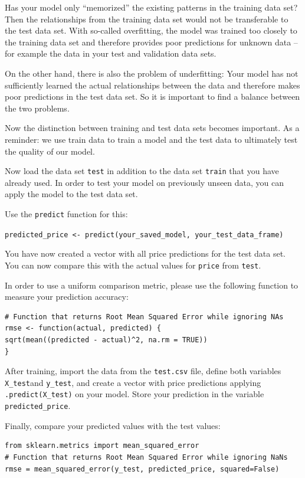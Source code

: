 \documentclass[
  11pt,
]{book}
\newenvironment{tips}[1]
  {
  \begin{itemize}
  \footnotesize
  \renewcommand{\labelitemi}{
    \raisebox{-.7\height}[0pt][0pt]{
      {\setkeys{Gin}{width=3em,keepaspectratio}
        \texttt{[image: images/\#1.png]}}
    }
  }
  \setlength{\fboxsep}{1em}
  \begin{rbox}
  \item
  }
  {
  \end{rbox}
  \end{itemize}
  }
\newenvironment{tipsp}[1]
  {
  \begin{itemize}
  \footnotesize
  \renewcommand{\labelitemi}{
    \raisebox{-.7\height}[0pt][0pt]{
      {\setkeys{Gin}{width=3em,keepaspectratio}
        \texttt{[image: images/\#1.png]}}
    }
  }
  \setlength{\fboxsep}{1em}
  \begin{pbox}
  \item
  }
  {
  \end{pbox}
  \end{itemize}
  }
\begin{document}
Has your model only ``memorized'' the existing patterns in the training data set?
Then the relationships from the training data set would not be transferable to the test data set. With so-called overfitting, the model was trained too closely to the training data set and therefore provides poor predictions for unknown data -- for example the data in your test and validation data sets.

On the other hand, there is also the problem of underfitting: Your model has not sufficiently learned the actual relationships between the data and therefore makes poor predictions in the test data set. So it is important to find a balance between the two problems.

Now the distinction between training and test data sets becomes important. As a reminder: we use train data to train a model and the test data to ultimately test the quality of our model.

Now load the data set \texttt{test} in addition to the data set \texttt{train} that you have already used. In order to test your model on previously unseen data, you can apply the model to the test data set.

\begin{tips}r

Use the \texttt{predict} function for this:

\texttt{predicted\_price\ \textless{}-\ predict(your\_saved\_model,\ your\_test\_data\_frame)}

You have now created a vector with all price predictions for the test data set. You can now compare this with the actual values for \texttt{price} from \texttt{test}.

In order to use a uniform comparison metric, please use the following function to measure your prediction accuracy:

\begin{verbatim}
# Function that returns Root Mean Squared Error while ignoring NAs
rmse <- function(actual, predicted) {
sqrt(mean((predicted - actual)^2, na.rm = TRUE))
}
\end{verbatim}

\end{tips}

\begin{tipsp}p

After training, import the data from the \texttt{test.csv} file, define both variables \texttt{X\_test}and \texttt{y\_test}, and create a vector with price predictions applying \texttt{.predict(X\_test)} on your model. Store your prediction in the variable \texttt{predicted\_price}.

Finally, compare your predicted values with the test values:

\begin{verbatim}
from sklearn.metrics import mean_squared_error
# Function that returns Root Mean Squared Error while ignoring NaNs
rmse = mean_squared_error(y_test, predicted_price, squared=False)
\end{verbatim}

\end{tipsp}
\end{document}
